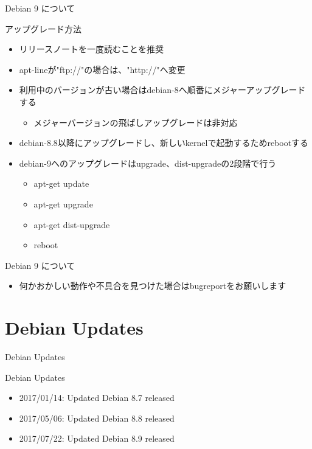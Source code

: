 \begin{frame}{Debian 9 について}%

アップグレード方法
\begin{itemize}
\item リリースノートを一度読むことを推奨
\item apt-lineが"ftp://"の場合は、"http://"へ変更
\item 利用中のバージョンが古い場合はdebian-8へ順番にメジャーアップグレードする
  \begin{itemize}  
  \item メジャーバージョンの飛ばしアップグレードは非対応
  \end{itemize}
\item debian-8.8以降にアップグレードし、新しいkernelで起動するためrebootする
\item debian-9へのアップグレードはupgrade、dist-upgradeの2段階で行う
  \begin{itemize}
  \item apt-get update
  \item apt-get upgrade
  \item apt-get dist-upgrade
  \item reboot
  \end{itemize}
\end{itemize}

\end{frame}


\begin{frame}{Debian 9 について}%
  \begin{itemize}
    \item 何かおかしい動作や不具合を見つけた場合はbugreportをお願いします
  \end{itemize}
\end{frame}


\section{Debian Updates}
\begin{frame}\begin{center}\Huge{Debian Updates}\end{center}\end{frame}


\begin{frame}{Debian Updates}%

\begin{itemize}[<+->]
\item 2017/01/14:  Updated Debian 8.7 released\\
\item 2017/05/06:  Updated Debian 8.8 released\\
\item 2017/07/22:  Updated Debian 8.9 released\\
\ \\
   \small{}

\end{itemize}

\end{frame}


